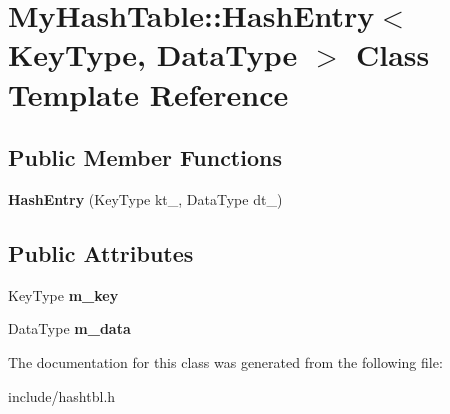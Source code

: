 \hypertarget{classMyHashTable_1_1HashEntry}{}\section{My\+Hash\+Table\+:\+:Hash\+Entry$<$ Key\+Type, Data\+Type $>$ Class Template Reference}
\label{classMyHashTable_1_1HashEntry}
\subsection*{Public Member Functions}
\begin{DoxyCompactItemize}
\item 
{\bfseries Hash\+Entry} (Key\+Type kt\+\_\+, Data\+Type dt\+\_\+)\hypertarget{classMyHashTable_1_1HashEntry_a09d07cf368713b32b7e1e7afb642fd4e}{}\label{classMyHashTable_1_1HashEntry_a09d07cf368713b32b7e1e7afb642fd4e}

\end{DoxyCompactItemize}
\subsection*{Public Attributes}
\begin{DoxyCompactItemize}
\item 
Key\+Type {\bfseries m\+\_\+key}\hypertarget{classMyHashTable_1_1HashEntry_a6c21a34f15fe303ef660935a594c2af0}{}\label{classMyHashTable_1_1HashEntry_a6c21a34f15fe303ef660935a594c2af0}

\item 
Data\+Type {\bfseries m\+\_\+data}\hypertarget{classMyHashTable_1_1HashEntry_a6b3be005322dffbb4cf26bacccdd37c3}{}\label{classMyHashTable_1_1HashEntry_a6b3be005322dffbb4cf26bacccdd37c3}

\end{DoxyCompactItemize}


The documentation for this class was generated from the following file\+:\begin{DoxyCompactItemize}
\item 
include/hashtbl.\+h\end{DoxyCompactItemize}

